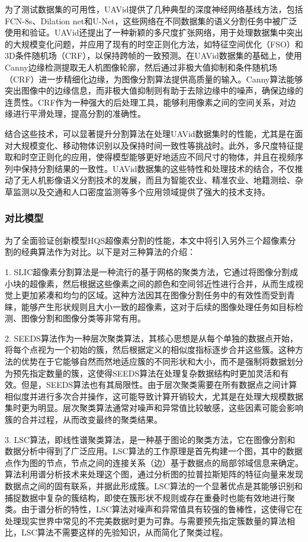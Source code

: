 为了测试数据集的可用性，UAVid提供了几种典型的深度神经网络基线方法，包括FCN-8s、Dilation net和U-Net，这些网络在不同数据集的语义分割任务中被广泛使用和验证。UAVid还提出了一种新颖的多尺度扩张网络，用于处理数据集中突出的大规模变化问题，并应用了现有的时空正则化方法，如特征空间优化（FSO）和3D条件随机场（CRF），以保持跨帧的一致预测。在UAVid数据集的基础上，使用Canny边缘检测提取无人机图像轮廓，然后通过非极大值抑制和条件随机场（CRF）进一步精细化边缘，为图像分割算法提供高质量的输入。Canny算法能够突出图像中的边缘信息，而非极大值抑制则有助于去除边缘中的噪声，确保边缘的连贯性。CRF作为一种强大的后处理工具，能够利用像素之间的空间关系，对边缘进行平滑处理，提高分割的准确性。

结合这些技术，可以显著提升分割算法在处理UAVid数据集时的性能，尤其是在面对大规模变化、移动物体识别以及保持时间一致性等挑战时。此外，多尺度特征提取和时空正则化的应用，使得模型能够更好地适应不同尺寸的物体，并且在视频序列中保持分割结果的一致性。UAVid数据集的这些特性和处理技术的结合，不仅推动了无人机影像语义分割技术的发展，而且为智能农业、精准农业、地籍测绘、杂草监测以及交通和人口密度监测等多个应用领域提供了强大的技术支持。


\subsubsection{对比模型}
为了全面验证创新模型HQS超像素分割的性能，本文中将引入另外三个超像素分割的经典算法作为对比。以下是对三种算法的介绍：

1. SLIC超像素分割算法是一种流行的基于网格的聚类方法，它通过将图像分割成小块的超像素，然后根据这些像素之间的颜色和空间邻近性进行合并，从而生成视觉上更加紧凑和均匀的区域。这种方法因其在图像分割任务中的有效性而受到青睐，能够产生形状规则且大小一致的超像素，这对于后续的图像处理任务如目标检测、图像分割和图像分类等非常有用。

2. SEEDS算法作为一种层次聚类算法，其核心思想是从每个单独的数据点开始，将每个点视为一个初始的簇，然后根据定义的相似度指标逐步合并这些簇。这种方法的优势在于它能够自然而然地适应簇的不同形状和大小，而不是强制将数据划分为预先指定数量的簇，这使得SEEDS算法在处理复杂数据结构时更加灵活和有效。但是，SEEDS算法也有其局限性。由于层次聚类需要在所有数据点之间计算相似度并进行多次合并操作，这可能导致计算开销较大，尤其是在处理大规模数据集时更为明显。层次聚类算法通常对噪声和异常值比较敏感，这些因素可能会影响簇的合并过程，从而改变最终的聚类结果。

3. LSC算法，即线性谱聚类算法，是一种基于图论的聚类方法，它在图像分割和数据分析中得到了广泛应用。LSC算法的工作原理是首先构建一个图，其中的数据点作为图的节点，节点之间的连接关系（边）基于数据点的局部邻域信息来确定。算法利用谱分析技术来处理这个图，通过分析图的拉普拉斯矩阵的特征向量来发现数据点之间的固有联系，并据此形成簇。LSC算法的一个显著优点是其能够识别和捕捉数据中复杂的簇结构，即使在簇形状不规则或存在重叠时也能有效地进行聚类。由于谱分析的特性，LSC算法对噪声和异常值具有较强的鲁棒性，这使得它在处理现实世界中常见的不完美数据时更为可靠。与需要预先指定簇数量的算法相比，LSC算法不需要这样的先验知识，从而简化了聚类过程。

